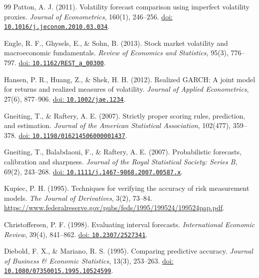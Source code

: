 \documentclass[12pt,a4paper]{article}
\numberwithin{equation}{section}
\begin{document}
\begin{thebibliography}{99}
Patton, A. J. (2011).
Volatility forecast comparison using imperfect volatility proxies.
\textit{Journal of Econometrics}, 160(1), 246--256.
\href{https://doi.org/10.1016/j.jeconom.2010.03.034}{doi: \nolinkurl{10.1016/j.jeconom.2010.03.034}}.

Engle, R. F., Ghysels, E., \& Sohn, B. (2013).
Stock market volatility and macroeconomic fundamentals.
\textit{Review of Economics and Statistics}, 95(3), 776--797.
\href{https://doi.org/10.1162/REST_a_00300}{doi: \nolinkurl{10.1162/REST_a_00300}}.

Hansen, P. R., Huang, Z., \& Shek, H. H. (2012).
Realized GARCH: A joint model for returns and realized measures of volatility.
\textit{Journal of Applied Econometrics}, 27(6), 877--906.
\href{https://doi.org/10.1002/jae.1234}{doi: \nolinkurl{10.1002/jae.1234}}.

Gneiting, T., \& Raftery, A. E. (2007).
Strictly proper scoring rules, prediction, and estimation.
\textit{Journal of the American Statistical Association}, 102(477), 359--378.
\href{https://doi.org/10.1198/016214506000001437}{doi: \nolinkurl{10.1198/016214506000001437}}.

Gneiting, T., Balabdaoui, F., \& Raftery, A. E. (2007).
Probabilistic forecasts, calibration and sharpness.
\textit{Journal of the Royal Statistical Society: Series B}, 69(2), 243--268.
\href{https://doi.org/10.1111/j.1467-9868.2007.00587.x}{doi: \nolinkurl{10.1111/j.1467-9868.2007.00587.x}}.

Kupiec, P. H. (1995).
Techniques for verifying the accuracy of risk measurement models.
\textit{The Journal of Derivatives}, 3(2), 73--84.
\url{https://www.federalreserve.gov/pubs/feds/1995/199524/199524pap.pdf}.

Christoffersen, P. F. (1998).
Evaluating interval forecasts.
\textit{International Economic Review}, 39(4), 841--862.
\href{https://doi.org/10.2307/2527341}{doi: \nolinkurl{10.2307/2527341}}.

Diebold, F. X., \& Mariano, R. S. (1995).
Comparing predictive accuracy.
\textit{Journal of Business \& Economic Statistics}, 13(3), 253--263.
\href{https://doi.org/10.1080/07350015.1995.10524599}{doi: \nolinkurl{10.1080/07350015.1995.10524599}}.

\end{thebibliography}

\clearpage
\appendix
\end{document}
